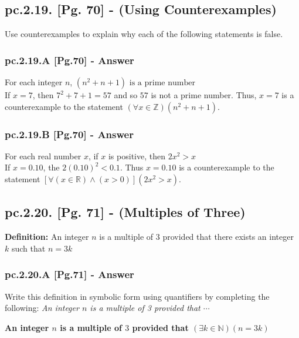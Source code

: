 \subsection{pc.2.19. [Pg. 70] - (Using Counterexamples)}
Use counterexamples to explain why each of the following statements is false. 

\subsubsection*{pc.2.19.A [Pg.70] - Answer}
For each integer $n$, $(n^2 + n + 1) \text{ is a prime number}$ \\

If $x = 7$, then $7^2 + 7 + 1 = 57$ and so $57$ is not a prime number. Thus, $x = 7$ is a counterexample to the statement $(\forall x \in \mathbb{Z})(n^2 + n + 1)$. \\

\subsubsection*{pc.2.19.B [Pg.70] - Answer}
For each real number $x$, if $x$ is positive, then $2x^2 > x $ \\

If $x = 0.10$, the $2(0.10)^2 < 0.1$. Thus $x = 0.10$ is a counterexample to the statement $[\forall (x \in \mathbb{R}) \wedge (x > 0)](2x^2 > x)$. \\


\subsection{pc.2.20. [Pg. 71] - (Multiples of Three)}
\begin{tcolorbox}
{\bf Definition:} An integer $n$ is a multiple of $3$ provided that there exists an integer $k$ such that $n = 3k$
\end{tcolorbox}

\subsubsection*{pc.2.20.A [Pg.71] - Answer}
Write this definition in symbolic form using quantifiers by completing the following: {\it An integer $n$ is a multiple of 3 provided that $\cdots$} \\
	\begin{center}
	\bf An integer $n$ is a multiple of $3$ provided that $(\exists k \in \mathbb{N})(n = 3k)$
	\end{center}
	
